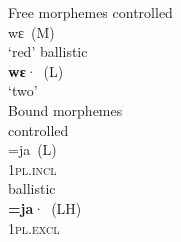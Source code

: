 \documentclass[output=paper]{langscibook}
\begin{document}


\ea\label{extab:dobui:6start}\label{extab:dobui:6free} Free morphemes
     \ea controlled\\
          wɛ~(M)\\
          \glt  ‘red’
     \ex ballistic \\
          \textbf{wɛ}·~(L)\\
          \glt  ‘two’\\
     \z
\z
\ea Bound morphemes \label{extab:dobui:6bound}\\
     \ea controlled\\
          =ja~(L)\\
          1\textsc{pl.incl} \\
     \ex ballistic\\
          \textbf{=ja}·~(LH)\\
          \textsc{1pl.excl}\\
     \z
\z
\end{document}
